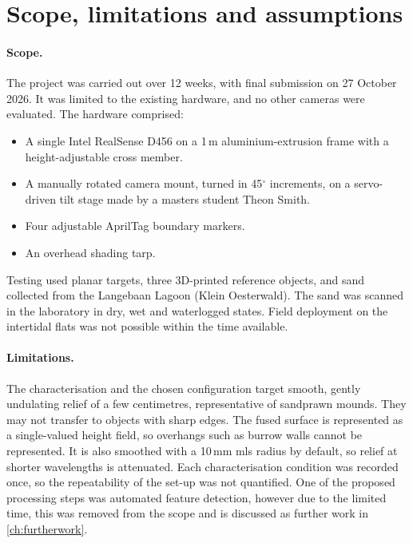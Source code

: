 \section{Scope, limitations and assumptions}
\label{sec:ch1.scope}
\paragraph{Scope.} The project was carried out over 12 weeks, with final submission on 27 October 2026. It was limited to the existing hardware, and no other cameras were evaluated. The hardware comprised:
\begin{itemize}
	\item A single Intel RealSense D456 on a 1\,m aluminium-extrusion frame with a height-adjustable cross member.
	
	\item A manually rotated camera mount, turned in 45$^{\circ}$ increments, on a servo-driven tilt stage made by a masters student Theon Smith.
	
	\item Four adjustable AprilTag boundary markers.
	
	\item An overhead shading tarp.
\end{itemize}
Testing used planar targets, three 3D-printed reference objects, and sand collected from the Langebaan Lagoon (Klein Oesterwald). The sand was scanned in the laboratory in dry, wet and waterlogged states. Field deployment on the intertidal flats was not possible within the time available.

\paragraph{Limitations.} The characterisation and the chosen configuration target smooth, gently undulating relief of a few centimetres, representative of sandprawn mounds. They may not transfer to objects with sharp edges. The fused surface is represented as a single-valued height field, so overhangs such as burrow walls cannot be represented. It is also smoothed with a 10\,mm \gls{mls} radius by default, so relief at shorter wavelengths is attenuated. Each characterisation condition was recorded once, so the repeatability of the set-up was not quantified. One of the proposed processing steps was automated feature detection, however due to the limited time, this was removed from the scope and is discussed as further work in \autoref{ch:furtherwork}. 

